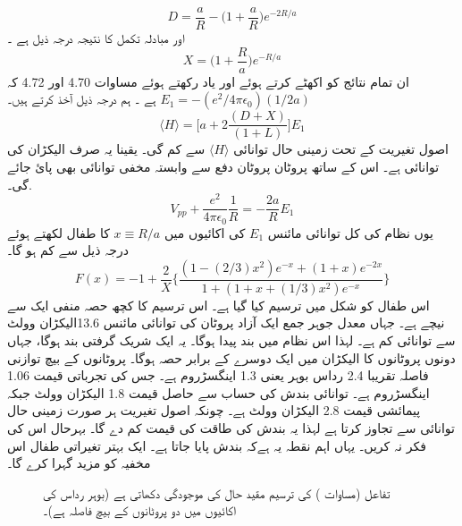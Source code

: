 \[D=\frac{a}{R}-\big(1+\frac{a}{R}\big)e^{-2R/a}\]
اور مبادلہ تکمل کا نتیجہ درجہ ذیل ہے ۔ 
\[X=\big(1+\frac{R}{a}\big)e^{-R/a}\]
ان تمام نتائج کو اکھٹے کرتے ہوئے اور یاد رکھتے ہوئے مساوات 4.70 اور 4.72 کہ 
\(E_{1}=-(e^{2}/4\pi\epsilon_{0})(1/2a)\)
ہے ۔ ہم درجہ ذیل آخذ کرتے ہیں۔
\[\langle H \rangle =\big[a+2\frac{(D+X)}{(1+L)}\big]E_{1}\]
اصول تغیریت کے تحت زمینی حال توانائی  
\(\langle H \rangle\)
 سے کم گی۔ یقینا  یہ صرف الیکڑان کی توانائی ہے۔ اس کے ساتھ پروٹان پروٹان دفع سے وابستہ مخفی توانائی بھی پائ جائے گی۔.
\[V_{pp}+\frac{e^{2}}{4\pi\epsilon_{0}}\frac{1}{R}=-\frac{2a}{R}E_{1}\]
یوں نظام کی  کل توانائی مائنس
\(E_{1}\)
  کی  اکائیوں میں 
  \(x\equiv R/a\)
  کا طفال لکھتے ہوئے درجہ ذیل سے کم ہو گا۔
  \[F(x)=-1+\frac{2}{X}\big\{\frac{(1-(2/3)x^{2})e^{-x}+(1+x)e^{-2x}}{1+(1+x+(1/3)x^{2})e^{-x}}\big\}\]
اس طفال کو شکل     میں ترسیم کیا گیا ہے۔ اس ترسیم کا کچھ حصہ منفی ایک سے نیچے ہے۔ جہاں معدل جوہر جمع ایک آزاد پروٹان کی توانائی مائنس  13.6الیکڑان وولٹ سے توانائی کم ہے۔ لہذا اس نظام میں بند پیدا ہوگا۔ یہ ایک شریک گرفتی بند ہوگا، جہاں دونوں پروٹانوں کا الیکڑان میں ایک دوسرے کے برابر حصہ ہوگا۔ پروٹانوں کے بیچ توازنی فاصلہ تقریبا 2.4 رداس بوہر یعنی 1.3 اینگسڑروم ہے۔ جس کی تجرباتی قیمت 1.06 اینگسڑروم ہے۔ توانائی بندش کی حساب سے حاصل قیمت 1.8 الیکڑان وولٹ جبکہ پیمائشی قیمت 2.8 الیکڑان وولٹ ہے۔ چونکہ اصول تغیریت ہر صورت زمینی حال توانائی سے تجاوز کرتا ہے لہذا یہ بندش کی طاقت کی قیمت کم دے گا۔ بہرحال اس کی فکر نہ کریں۔ یہاں اہم نقطہ یہ ہےکہ بندش پایا جاتا ہے۔ ایک بہتر تغیراتی طفال اس مخفیہ کو مزید گہرا کرے گا۔ 
\begin{figure}
\centering
{}
\caption{تفاعل  (مساوات )  کی ترسیم  مقید حال کی موجودگی دکھاتی ہے (بوہر رداس کی اکائیوں میں  دو پروٹانوں کے بیچ فاصلہ ہے)۔ }
\label{شکل_تغیریت_مقید_حال}
\end{figure}


